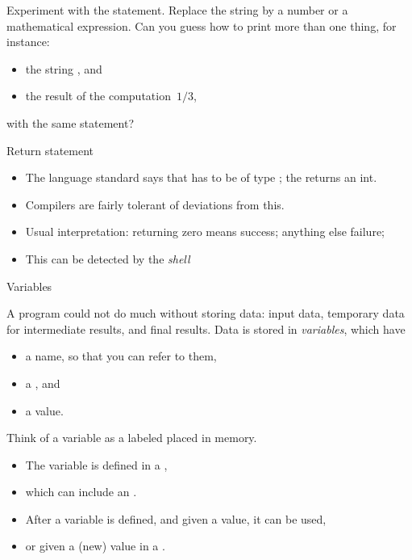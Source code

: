 \begin{exercise}
  \label{ex:cout-what}
  Experiment with the  statement. Replace the string by a
  number or a mathematical expression. Can you guess how to print more
  than one thing, for instance:
  \begin{itemize}
  \item the string , and
  \item the result of the computation~$1/3$,     
  \end{itemize}
  with the same  statement?
\end{exercise}

\begin{block}{Return statement}
  \begin{itemize}
  \item The language standard says that  has to be of type
    ; the  returns an int.
  \item Compilers are fairly tolerant of deviations from this.
  \item Usual interpretation: returning zero means success; anything else failure;
  \item This  can be detected by the
    \emph{shell}
  \end{itemize}
\end{block}

 {Variables}
\label{sec:variables}

A program could not do much without storing data: input data,
temporary data for intermediate results, and final results.
Data is stored in \emph{variables},  which have
\begin{itemize}
\item a name, so that you can refer to them,
\item a , and
\item a value.
\end{itemize}
Think of a variable as a labeled placed in memory.
\begin{itemize}
\item The variable is defined in a
  ,
\item which can include an .
\item After a variable is defined, and given a value, it can be used,
\item or given a (new) value in a .
\end{itemize}

